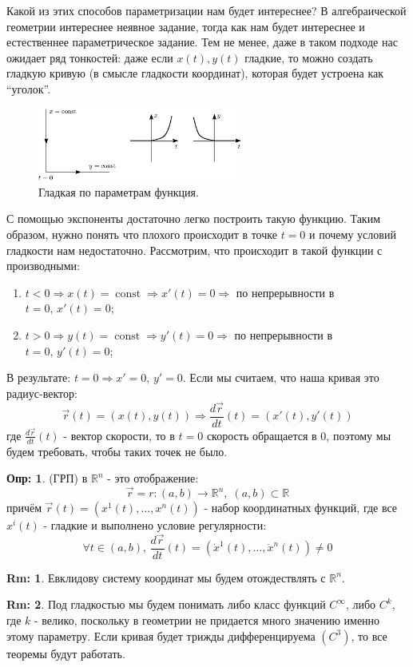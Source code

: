 \documentclass[12pt]{article}
\newcommand{\MR}{\mathbb{R}}
\theoremstyle{definition}
\newtheorem{defn}{Опр:}
\newtheorem{rem}{Rm:}
\DeclareMathOperator{\const}{\text{const}}
\begin{document}
Какой из этих способов параметризации нам будет интереснее? В алгебраической геометрии интереснее неявное задание, тогда как нам будет интереснее и естественнее параметрическое задание. Тем не менее, даже в таком подходе нас ожидает ряд тонкостей: даже если $x(t), y(t)$ гладкие, то можно создать гладкую кривую (в смысле гладкости координат), которая будет устроена как ``уголок''.
\begin{figure}[H]
	\centering
	\includegraphics[width=0.6\textwidth]{CDGL1_6.eps}
	\caption{Гладкая по параметрам функция.}
	\label{1_6}
\end{figure}
С помощью экспоненты достаточно легко построить такую функцию. Таким образом, нужно понять что плохого происходит в точке $t = 0$ и почему условий гладкости нам недостаточно. Рассмотрим, что происходит в такой функции с производными: 
\begin{enumerate}[label=\arabic*)]
	\item $t < 0 \Rightarrow x(t) = \const \Rightarrow x'(t) = 0 \Rightarrow$ по непрерывности в $t = 0, \, x'(t) = 0$;
	\item $t > 0 \Rightarrow y(t) = \const \Rightarrow y'(t) = 0 \Rightarrow$ по непрерывности в $t = 0, \, y'(t) = 0$;
\end{enumerate}
В результате: $t = 0 \Rightarrow x' = 0,\, y' = 0$. Если мы считаем, что наша кривая это радиус-вектор: 
$$
	\vec{r}(t) = (x(t), y(t)) \Rightarrow \dfrac{d\vec{r}}{dt}(t) = (x'(t), y'(t))
$$
где $\tfrac{d\vec{r}}{dt}(t)$ - вектор скорости, то в $t = 0$ скорость обращается в $0$, поэтому мы будем требовать, чтобы таких точек не было.

\begin{defn}
	 (ГРП) в $\MR^n$ - это отображение: 
	$$
		\vec{r} = r \colon (a,b) \to \MR^n, \; (a,b)\subset \MR
	$$ 
	причём $\vec{r}(t) = (x^1(t), \dotsc, x^n(t))$ - набор координатных функций, где все $x^i(t)$ - гладкие и выполнено условие регулярности:
	$$
		\forall t\in (a,b), \, \dfrac{d \vec{r}}{dt}(t) = (\dot{x}^1(t), \dotsc, \dot{x}^n(t)) \neq 0
	$$
\end{defn}

\begin{rem}
	Евклидову систему координат мы будем отождествлять с $\MR^n$. 
\end{rem}
\begin{rem}
	Под гладкостью мы будем понимать либо класс функций $C^\infty$, либо $C^k$, где $k$ - велико, поскольку в геометрии не придается много значению именно этому параметру. Если кривая будет трижды дифференцируема $(C^3)$, то все теоремы будут работать.
\end{rem}
\end{document}
